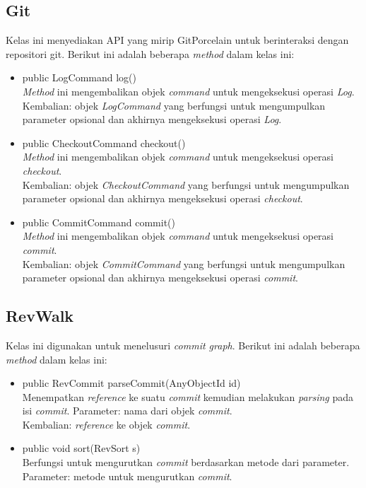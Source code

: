 \subsection{Git}
\label{subsec:Git}
Kelas ini menyediakan API yang mirip GitPorcelain untuk berinteraksi dengan repositori git\cite{JGit_java_doc}. Berikut ini adalah beberapa \textit{method} dalam kelas ini:
\begin{itemize}
\item public LogCommand log()\\
\textit{Method} ini mengembalikan objek \textit{command} untuk mengeksekusi operasi \textit{Log}.\\
Kembalian: objek \textit{LogCommand} yang berfungsi untuk mengumpulkan parameter opsional dan akhirnya mengeksekusi operasi \textit{Log}.
\item public CheckoutCommand checkout()\\
\textit{Method} ini mengembalikan objek \textit{command} untuk mengeksekusi operasi \textit{checkout}.\\
Kembalian: objek \textit{CheckoutCommand} yang berfungsi untuk mengumpulkan parameter opsional dan akhirnya mengeksekusi operasi \textit{checkout}.
\item public CommitCommand commit()\\
\textit{Method} ini mengembalikan objek \textit{command} untuk mengeksekusi operasi \textit{commit}.\\
Kembalian: objek \textit{CommitCommand} yang berfungsi untuk mengumpulkan parameter opsional dan akhirnya mengeksekusi operasi \textit{commit}.
\end{itemize}

\subsection{RevWalk}
\label{subsec:revwalk}
Kelas ini digunakan untuk menelusuri \textit{commit graph}.  Berikut ini adalah beberapa \textit{method} dalam kelas ini:
\begin{itemize}
\item public RevCommit parseCommit(AnyObjectId id)\\
Menempatkan \textit{reference} ke suatu \textit{commit} kemudian melakukan \textit{parsing} pada isi \textit{commit}.
Parameter: nama dari objek \textit{commit}.\\
Kembalian: \textit{reference} ke objek \textit{commit}.
\item public void sort(RevSort s)\\
Berfungsi untuk mengurutkan \textit{commit} berdasarkan metode dari parameter.\\
Parameter: metode untuk mengurutkan \textit{commit}.
\end{itemize}

